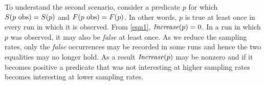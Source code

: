 To understand the second scenario, consider a predicate $p$ for which
$S(\text{$p$ obs}) = S(p)$ and $F(\text{$p$ obs}) = F(p)$.
In other words, $p$ is true at least once in every run in which it is
observed.  From \autoref{eqn1}, $\mathit{Increase}(p) = 0$.  In a run 
in which $p$ was observed, it may also be \emph{false} at least once.  As we
reduce the sampling rates, only the \emph{false} occurrences may be recorded
in some runs and hence the two equalities may no longer hold.  As a result
$\mathit{Increase}(p)$ may be nonzero and if it becomes positive a predicate that
was not interesting at higher sampling rates becomes interesting at lower 
sampling rates.

